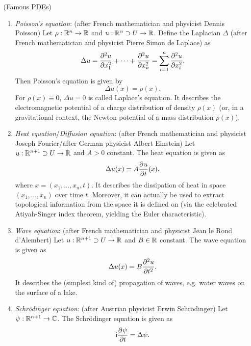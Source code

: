 \documentclass[11pt]{article}
\begin{document}
		\begin{eg}
			(Famous PDEs)
			\begin{enumerate}
				\item \textit{Poisson's equation}: (after French mathematician and physicist Dennis Poisson) Let $\rho:\R^n\rightarrow\R$ and $u:\R^n\supset U\rightarrow\R$. Define the Laplacian $\Delta$ (after French mathematician and physicist Pierre Simon de Laplace) as
				\begin{equation*}
					\Delta u=\del[2]{u}{x_1^2}+\dots+\del[2]{u}{x_n^2}=\sum_{i=1}^n\del[2]{u}{x_i^2}.
				\end{equation*}
				Then Poisson's equation is given by
				\begin{equation*}
					\Delta u(x)=\rho(x).
				\end{equation*}
				For $\rho(x)\equiv0$, $\Delta u=0$ is called Laplace's equation. It describes the electromagnetic potential of a charge distribution of density $\rho(x)$ (or, in a gravitational context, the Newton potential of a mass distribution $\rho(x)$).
				\item \textit{Heat equation}/\textit{Diffusion equation}: (after French mathematician and physicist Joseph Fourier/after German physicist Albert Einstein) Let $u:\R^{n+1}\supset U\rightarrow\R$ and $A>0$ constant. The heat equation is given as
				\begin{equation*}
					\Delta u(x)=A\del[]{u}{t}(x),
				\end{equation*} 
				where $x=(x_1,\dots,x_n,t)$. It describes the dissipation of heat in space $(x_1,\dots,x_n)$ over time $t$. Moreover, it can actually be used to extract topological information from the space it is defined on (via the celebrated Atiyah-Singer index theorem, yielding the Euler characteristic).
				\item \textit{Wave equation}: (after French mathematician and physicist Jean le Rond d'Alembert) Let $u:\R^{n+1}\supset U\rightarrow\R$ and $B\in\R$ constant. The wave equation is given as
				\begin{equation*}
					\Delta u(x)=B\del[2]{u}{t^2}.
				\end{equation*}
				It describes the (simplest kind of) propagation of waves, e.g. water waves on the surface of a lake.
				\item \textit{Schr{\"o}dinger equation}: (after Austrian physicist Erwin Schr\"odinger) Let $\psi:\R^{n+1}\rightarrow\CC$. The Schr{\"o}dinger equation is given as
				\begin{equation*}
					\mathrm{i}\del[]{\psi}{t}=\Delta\psi.

\end{equation*}
\end{enumerate}
\end{eg}
\end{document}
